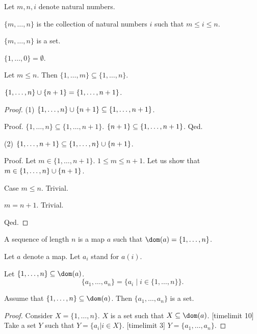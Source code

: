 \documentclass[11pt]{article}
\newcommand{\Seq}[2]{\{#1,\dots,#2\}}
\newcommand{\FinSet}[3]{\{#1_{#2},\dots,#1_{#3}\}}
\begin{document}
\begin{forthel}

Let $m,n,i$ denote natural numbers.

\begin{definition}
$\Seq{m}{n}$ is the collection of
natural numbers $i$ such that $m \leq i \leq n$.
\end{definition}

\begin{lemma}
$\Seq{m}{n}$ is a set.
\end{lemma}

\begin{lemma}
$\Seq{1}{0} = \emptyset$.
\end{lemma}

\begin{lemma}
Let $m \leq n$. Then $\Seq{1}{m} \subseteq \Seq{1}{n}$.
\end{lemma}

\begin{lemma}
$\Seq{1}{n} \cup \sing{n+1} = \Seq{1}{n+1}$.
\end{lemma}
\begin{proof}

(1) $\Seq{1}{n} \cup \sing{n+1} \subseteq \Seq{1}{n+1}$.

Proof. $\Seq{1}{n} \subseteq \Seq{1}{n+1}$.
$\sing{n+1} \subseteq \Seq{1}{n+1}$.
Qed.

(2) $\Seq{1}{n+1} \subseteq \Seq{1}{n} \cup \sing{n+1}$.

Proof.
Let $m \in \Seq{1}{n+1}$. $1 \leq m \leq n+1$. Let us show that 
$m \in \Seq{1}{n} \cup \sing{n+1}$.

Case $m \leq n$. Trivial.

$m = n+1$. Trivial.

Qed.

\end{proof}

\begin{definition}
A sequence of length $n$ is a
map $a$ such that $\dom(a) = \Seq{1}{n}$.
\end{definition}

Let $a$ denote a map.
Let $a_{i}$ stand for $a(i)$.

\begin{definition}
Let $\Seq{1}{n} \subseteq \dom(a)$.
\[\FinSet{a}{1}{n} = \{ a_{i} \mid i \in \Seq{1}{n}\}.\]
\end{definition}


\begin{lemma}
Assume that $\Seq{1}{n} \subseteq \dom(a)$.
Then $\FinSet{a}{1}{n}$ is a set.
\end{lemma}
\begin{proof}
Consider $X = \Seq{1}{n}$. $X$ is a set such that $X \subseteq \dom(a)$.
[timelimit 10]
Take a set $Y$ such that $Y = \{ a_{i} | i \in X\}$.
[timelimit 3]
$Y = \FinSet{a}{1}{n}$.
\end{proof}



\end{forthel}
\end{document}
